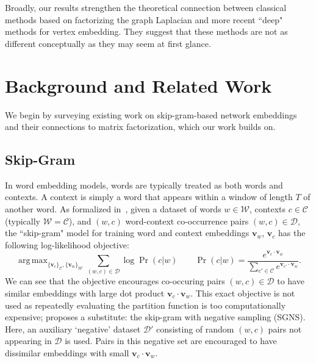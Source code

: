 \documentclass[sigconf]{acmart}
\DeclareMathOperator*{\argmax}{arg\,max}
\newcommand{\mbf}[1]{\mathbf{#1}}
\begin{document}
Broadly, our results strengthen the theoretical connection between classical methods based on factorizing the graph Laplacian and more recent ``deep" methods for vertex embedding. They suggest that these methods are not as different conceptually as they may seem at first glance.

\section{Background and Related Work}

We begin by surveying existing work on skip-gram-based network embeddings and their connections to matrix factorization, which our work builds on.

\subsection{Skip-Gram} In word embedding models, words are typically treated as both words and contexts. A context is simply a word that appears within a window of length $T$ of another word. As formalized in~\cite{goldberg2014word2vec}, given a dataset of words $w \in \mathcal{W}$, contexts $c \in \mathcal{C}$ (typically $\mathcal{W} = \mathcal{C}$), and $(w, c)$ word-context co-occurrence pairs $(w, c) \in \mathcal{D}$, the ``skip-gram" model for training word and context embeddings $\mbf{v}_w$, $\mbf{v}_c$ \cite{mikolov2013distributed} has the following log-likelihood objective:
%
\[ \argmax_{\{\mbf{v}_c\}_{\mathcal{C}},\{\mbf{v}_w\}_{\mathcal{W}}} \sum_{(w,c) \in  \mathcal{D}} \log \Pr(c|w)
\qquad \Pr(c|w) = \frac{e^{\mbf{v}_c \cdot \mbf{v}_w}}{\sum_{c' \in \mathcal{C}} e^{\mbf{v}_{c'} \cdot \mbf{v}_w}} .\]
%
We can see that the objective encourages co-occuring pairs $(w,c) \in \mathcal{D}$ to have similar embeddings with large dot  product $\mbf{v}_c \cdot \mbf{v}_w$.
This exact objective is not used as repeatedly evaluating the partition function is too computationally expensive; \cite{mikolov2013distributed} proposes a substitute: the skip-gram with negative sampling (SGNS).
%
%
Here, an auxiliary `negative' dataset $\mathcal{D'}$ consisting of random $(w,c)$ pairs not appearing in $\mathcal{D}$ is used. Pairs in this negative set are encouraged to have dissimilar embeddings  with small $\mbf{v}_c \cdot \mbf{v}_w$.
\end{document}
